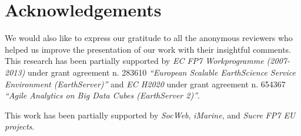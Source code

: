 \section{Acknowledgements}
\label{section:acknowledge}

We would also like to express our gratitude to all the anonymous reviewers who helped us improve the presentation of our work with their insightful comments. This research has been partially supported by \emph{EC FP7 Workprogramme (2007-2013)} under grant agreement n. 283610 \emph{``European Scalable EarthScience Service Environment (EarthServer)''} and \emph{EC H2020} under grant agreement n. 654367 \emph{``Agile Analytics on Big Data Cubes (EarthServer 2)''}.

This  work  has  been  partially  supported  by \emph{SocWeb}, \emph{iMarine}, and \emph{Sucre} \emph{FP7 EU projects}.
